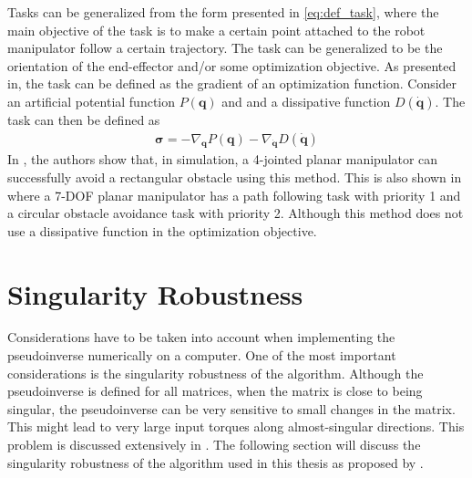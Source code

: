 Tasks can be generalized from the form presented in \autoref{eq:def_task}, where
the main objective of the task is to make a certain point attached to the robot
manipulator follow a certain trajectory. The task can be generalized to be the
orientation of the end-effector and/or some optimization objective. As presented
in\cite{nakamura1987}, the task can be defined as the gradient of an optimization
function. Consider an artificial potential function $P(\bm{q})$ and and a dissipative function
$D(\dot{\bm{q}})$. The task can then be defined as
\begin{align}
    \bm{\sigma} = -\nabla_{\bm{q}} P(\bm{q}) - \nabla_{\dot{\bm{q}}}D(\dot{\bm{q}})
\end{align}
In \cite{nakamura1987}, the authors show that, in simulation, a 4-jointed planar
manipulator can successfully avoid a rectangular obstacle using this method. This is
also shown in \cite{siciliano1991} where a 7-DOF planar manipulator has a path
following task with priority 1 and a circular obstacle avoidance task with priority 2.
Although this method does not use a dissipative function in the optimization objective.




\section{Singularity Robustness}

Considerations have to be taken into account when implementing the
pseudoinverse numerically on a computer. One of the most important considerations is the singularity
robustness of the algorithm. Although the pseudoinverse is defined for all matrices,
when the matrix is close to being singular, the pseudoinverse can be very sensitive
to small changes in the matrix. This might lead to very large input torques along
almost-singular directions. This problem is discussed extensively in \cite{chiaverini1997}.
The following section will discuss the singularity robustness of the algorithm used in this
thesis as proposed by \cite{chiaverini1997}.

